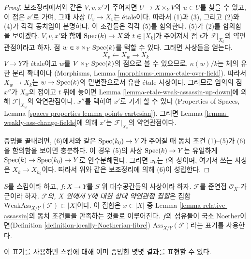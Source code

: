 \begin{proof}
보조정리에서와 같은 $V, v, x'$가 주어지면
$U \to X \times_Y V$와 $u \in U$를 찾을 수 있고, 이 점은 $x'$로 가며,
그때 사상 $U_v \to X_v$는 \'etale이다. 따라서 (1)과 (3), 그리고
(2)와 (4)가 각각 동치임이 분명하다. 이 조건들은 각각 (5)를 함의한다.
(5)가 (2)를 함의함을 보이겠다. $V, v, x'$와 함께
$\mathop{\mathrm{Spec}}(k) \to X$와 $t \in |X_k|$가 주어져서 점 $t$가
$\mathcal{F}|_{X_k}$의 약연관점이라고 하자.
점 $w \in v \times_Y \mathop{\mathrm{Spec}}(k)$를 택할 수 있다. 그러면 사상들을 얻는다.
$$
X_v \longleftarrow X_w \longrightarrow X_k
$$
$V \to Y$가 \'etale이고 $w$를 $V \times_Y \mathop{\mathrm{Spec}}(k)$의 점으로 볼 수
있으므로, $\kappa(w)/k$는 체의 유한 분리 확대이다
(Morphisms, Lemma \ref{morphisms-lemma-etale-over-field}).
따라서 $X_w \to X_k$는 $w \to \mathop{\mathrm{Spec}}(k)$의 밑변환으로서 유한 \'etale
사상이다. 그러므로 임의의 점 $x''$가 $X_w$의 점이고 $t$ 위에 놓이면 Lemma
\ref{lemma-etale-weak-assassin-up-down}에 의해
$\mathcal{F}|_{X_w}$의 약연관점이다. $x''$를 택하여 $x'$로 가게 할 수 있다
(Properties of Spaces, Lemma \ref{spaces-properties-lemma-points-cartesian}).
그러면 Lemma \ref{lemma-weakly-ass-change-fields}에 의해 $x'$는
$\mathcal{F}|_{X_v}$의 약연관점이다.

\medskip\noindent
증명을 끝내려면, (6)에서와 같은 $\mathop{\mathrm{Spec}}(k_0) \to Y$가 주어질 때
동치 조건 (1)--(5)가 (6)을 함의함을 보이면 충분하다. 이 경우 (5)의 사상
$\mathop{\mathrm{Spec}}(k) \to Y$는 유일하게 $\mathop{\mathrm{Spec}}(k) \to \mathop{\mathrm{Spec}}(k_0) \to Y$로
인수분해된다. 그러면 $x_0$는 $t$의 상이며, 여기서 쓰는 사상은
$X_k \to X_{k_0}$이다.
따라서 위와 같은 보조정리에 의해 (6)이 성립한다.
\end{proof}

\begin{definition}
\label{definition-relative-weak-assassin}
$S$를 스킴이라 하고, $f : X \to Y$를 $S$ 위 대수공간들의 사상이라 하자.
$\mathcal{F}$를 준연접 $\mathcal{O}_X$-가군이라 하자.
{\it $\mathcal{F}$의, $X$ 안에서 $Y$에 대한 상대 약연관점 집합}은
집합 $\text{WeakAss}_{X/Y}(\mathcal{F}) \subset |X|$이다. 이 집합은
$x \in |X|$ 중 Lemma \ref{lemma-relative-assassin}의 동치 조건들을
만족하는 것들로 이루어진다.
$f$의 섬유들이 국소 Noether이면(Definition
\ref{definition-locally-Noetherian-fibre})
$\text{Ass}_{X/Y}(\mathcal{F})$라는 표기를 사용한다.
\end{definition}

\noindent
이 표기를 사용하면 스킴에 대해 이미 증명한 몇몇 결과를 표현할 수 있다.

